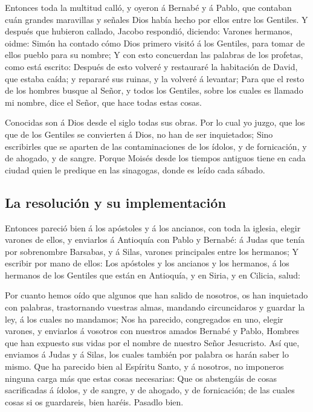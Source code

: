  Entonces toda la multitud calló, y oyeron á Bernabé y á
Pablo, que contaban cuán grandes maravillas y señales Dios había hecho
por ellos entre los Gentiles.  Y después que hubieron
callado, Jacobo respondió, diciendo: Varones hermanos, oidme:
 Simón ha contado cómo Dios primero visitó á los
Gentiles, para tomar de ellos pueblo para su nombre;  Y
con esto concuerdan las palabras de los profetas, como está escrito:
 Después de esto volveré y restauraré la habitación de
David, que estaba caída; y repararé sus ruinas, y la volveré á levantar;
 Para que el resto de los hombres busque al Señor, y
todos los Gentiles, sobre los cuales es llamado mi nombre, dice el
Señor, que hace todas estas cosas.

 Conocidas son á Dios desde el siglo todas sus obras.
 Por lo cual yo juzgo, que los que de los Gentiles se
convierten á Dios, no han de ser inquietados;  Sino
escribirles que se aparten de las contaminaciones de los ídolos, y de
fornicación, y de ahogado, y de sangre.  Porque Moisés
desde los tiempos antiguos tiene en cada ciudad quien le predique en las
sinagogas, donde es leído cada sábado.

\hypertarget{la-resoluciuxf3n-y-su-implementaciuxf3n}{%
\subsection{La resolución y su
implementación}\label{la-resoluciuxf3n-y-su-implementaciuxf3n}}

 Entonces pareció bien á los apóstoles y á los ancianos,
con toda la iglesia, elegir varones de ellos, y enviarlos á Antioquía
con Pablo y Bernabé: á Judas que tenía por sobrenombre Barsabas, y á
Silas, varones principales entre los hermanos;  Y
escribir por mano de ellos: Los apóstoles y los ancianos y los hermanos,
á los hermanos de los Gentiles que están en Antioquía, y en Siria, y en
Cilicia, salud:

 Por cuanto hemos oído que algunos que han salido de
nosotros, os han inquietado con palabras, trastornando vuestras almas,
mandando circuncidaros y guardar la ley, á los cuales no mandamos;
 Nos ha parecido, congregados en uno, elegir varones, y
enviarlos á vosotros con nuestros amados Bernabé y Pablo,
 Hombres que han expuesto sus vidas por el nombre de
nuestro Señor Jesucristo.  Así que, enviamos á Judas y á
Silas, los cuales también por palabra os harán saber lo mismo.
 Que ha parecido bien al Espíritu Santo, y á nosotros, no
imponeros ninguna carga más que estas cosas necesarias: 
Que os abstengáis de cosas sacrificadas á ídolos, y de sangre, y de
ahogado, y de fornicación; de las cuales cosas si os guardareis, bien
haréis. Pasadlo bien.

